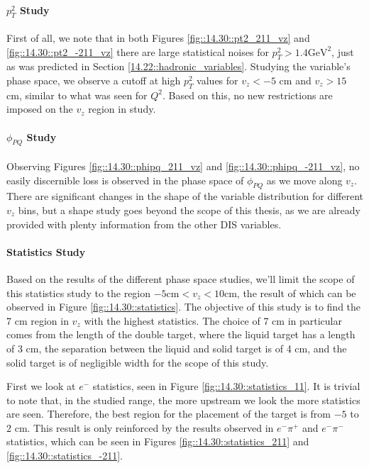     \paragraph{$p_T^2$ Study}
        First of all, we note that in both Figures \ref{fig::14.30::pt2_211_vz} and \ref{fig::14.30::pt2_-211_vz} there are large statistical noises for $p_T^2 > 1.4 \text{GeV}^2$, just as was predicted in Section \ref{14.22::hadronic_variables}.
        Studying the variable's phase space, we observe a cutoff at high $p_T^2$ values for $v_z < -5$ cm and $v_z > 15$ cm, similar to what was seen for $Q^2$.
        Based on this, no new restrictions are imposed on the $v_z$ region in study.

    \paragraph{$\phi_{PQ}$ Study}
        Observing Figures \ref{fig::14.30::phipq_211_vz} and \ref{fig::14.30::phipq_-211_vz}, no easily discernible loss is observed in the phase space of $\phi_{PQ}$ as we move along $v_z$.
        There are significant changes in the shape of the variable distribution for different $v_z$ bins, but a shape study goes beyond the scope of this thesis, as we are already provided with plenty information from the other DIS variables.

    \paragraph{Statistics Study}
        Based on the results of the different phase space studies, we'll limit the scope of this statistics study to the region $-5 \text{cm} < v_z < 10 \text{cm}$, the result of which can be observed in Figure \ref{fig::14.30::statistics}.
        The objective of this study is to find the 7 cm region in $v_z$ with the highest statistics.
        The choice of 7 cm in particular comes from the length of the double target, where the liquid target has a length of 3 cm, the separation between the liquid and solid target is of 4 cm, and the solid target is of negligible width for the scope of this study.

        First we look at $e^-$ statistics, seen in Figure \ref{fig::14.30::statistics_11}.
        It is trivial to note that, in the studied range, the more upstream we look the more statistics are seen.
        Therefore, the best region for the placement of the target is from $-5$ to $2$ cm.
        This result is only reinforced by the results observed in $e^-\pi^+$ and $e^-\pi^-$ statistics, which can be seen in Figures \ref{fig::14.30::statistics_211} and \ref{fig::14.30::statistics_-211}.

